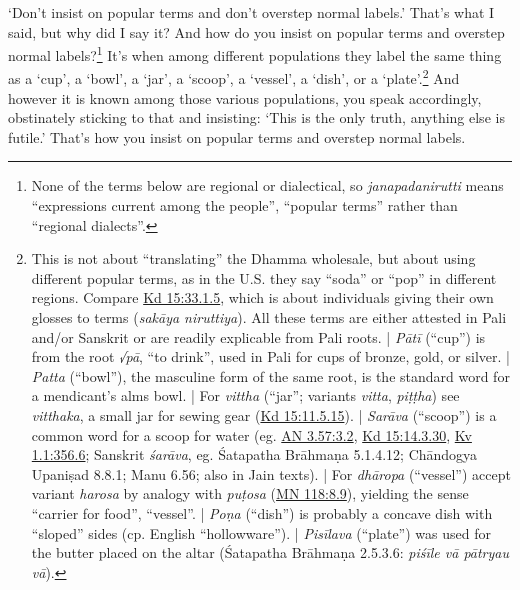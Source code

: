 \documentclass[12pt,openany]{book}%
\begin{document}
‘Don’t insist on popular terms and don’t overstep normal labels.’ That’s what I said, but why did I say it? And how do you insist on popular terms and overstep normal labels?\footnote{None of the terms below are regional or dialectical, so \textit{janapadanirutti} means “expressions current among the people”, “popular terms” rather than “regional dialects”. } It’s when among different populations they label the same thing as a ‘cup’, a ‘bowl’, a ‘jar’, a ‘scoop’, a ‘vessel’, a ‘dish’, or a ‘plate’.\footnote{This is not about “translating” the Dhamma wholesale, but about using different popular terms, as in the U.S. they say “soda” or “pop” in different regions. Compare \href{https://suttacentral.net/pli-tv-kd15/en/sujato\#33.1.5}{Kd 15:33.1.5}, which is about individuals giving their own glosses to terms (\textit{\textsanskrit{sakāya} niruttiya}). All these terms are either attested in Pali and/or Sanskrit or are readily explicable from Pali roots. | \textit{\textsanskrit{Pātī}} (“cup”) is from the root \textit{√\textsanskrit{pā}}, “to drink”, used in Pali for cups of bronze, gold, or silver. | \textit{Patta} (“bowl”), the masculine form of the same root, is the standard word for a mendicant’s alms bowl. | For \textit{vittha} (“jar”; variants \textit{vitta}, \textit{\textsanskrit{piṭṭha}}) see \textit{vitthaka}, a small jar for sewing gear (\href{https://suttacentral.net/pli-tv-kd15/en/sujato\#11.5.15}{Kd 15:11.5.15}). | \textit{\textsanskrit{Sarāva}} (“scoop”) is a common word for a scoop for water (eg. \href{https://suttacentral.net/an3.57/en/sujato\#3.2}{AN 3.57:3.2}, \href{https://suttacentral.net/pli-tv-kd15/en/sujato\#14.3.30}{Kd 15:14.3.30}, \href{https://suttacentral.net/kv1.1/en/sujato\#356.6}{Kv 1.1:356.6}; Sanskrit \textit{\textsanskrit{śarāva}}, eg. Śatapatha \textsanskrit{Brāhmaṇa} 5.1.4.12; \textsanskrit{Chāndogya} \textsanskrit{Upaniṣad} 8.8.1; Manu 6.56; also in Jain texts). | For \textit{\textsanskrit{dhāropa}} (“vessel”) accept variant \textit{harosa} by analogy with \textit{\textsanskrit{puṭosa}} (\href{https://suttacentral.net/mn118/en/sujato\#8.9}{MN 118:8.9}), yielding the sense “carrier for food”, “vessel”. | \textit{\textsanskrit{Poṇa}} (“dish”) is probably a concave dish with “sloped” sides (cp. English “hollowware”). | \textit{\textsanskrit{Pisīlava}} (“plate”) was used for the butter placed on the altar (Śatapatha \textsanskrit{Brāhmaṇa} 2.5.3.6: \textit{\textsanskrit{piśīle} \textsanskrit{vā} \textsanskrit{pātryau} \textsanskrit{vā}}). } And however it is known among those various populations, you speak accordingly, obstinately sticking to that and insisting: ‘This is the only truth, anything else is futile.’ That’s how you insist on popular terms and overstep normal labels. 
\end{document}
